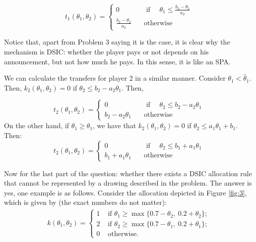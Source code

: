 \documentclass[a4paper]{article}
\begin{document}
\[t_1(\theta_1,\theta_2)=\left\{\begin{array}{cc} 0 & \quad\text{ if }\quad  \theta_1\leq\frac{b_2-\theta_2}{a_2}\\
	\frac{b_2-\theta_2}{a_2} & \quad\text{otherwise}\quad
	
\end{array}
\right.
\]

Notice that, apart from Problem 3 saying it is the case, it is clear why the mechanism is DSIC: whether the player pays or not depends on his announcement, but not how much he pays. In this sense, it is like an SPA.

We can calculate the transfers for player 2 in a similar manner. Consider $\theta_1<\hat{\theta}_1$. Then, $k_2(\theta_1,\theta_2)=0$ if $\theta_2\leq b_2-a_2 \theta_1$. Then,

\[t_2(\theta_1,\theta_2)=\left\{\begin{array}{cc} 0 & \quad\text{ if }\quad  \theta_2\leq b_2-a_2 \theta_1\\
	b_2-a_2 \theta_1 & \quad\text{otherwise}\quad
	
\end{array}
\right.
\]
On the other hand, if $\theta_1\geq\hat{\theta}_1$, we have that $k_2(\theta_1,\theta_2)=0$ if $\theta_2\leq a_1\theta_1+b_1$. Then:
\[t_2(\theta_1,\theta_2)=\left\{\begin{array}{cc} 0 & \quad\text{ if }\quad  \theta_2\leq b_1+a_1 \theta_1\\
	b_1+a_1 \theta_1 & \quad\text{otherwise}\quad
	
\end{array}
\right.
\]



Now for the last part of the question: whether there exists a DSIC allocation rule that cannot be represented by a drawing described in the problem. The answer is yes, one example is as follows.
Consider the allocation depicted in Figure \ref{fig:3}, which is given by (the exact numbers do not matter):
\begin{align*}
	k(\theta_1,\theta_2) = \begin{cases}
		1 & \text{ if } \theta_1 \geq \max\{ 0.7 - \theta_2, \ 0.2 + \theta_2 \};
		\\
		2 & \text{ if } \theta_2 \geq \max\{ 0.7 - \theta_1, \ 0.2 + \theta_1 \};
		\\
		0 & \text{ otherwise.}
	\end{cases}
\end{align*}
\end{document}
